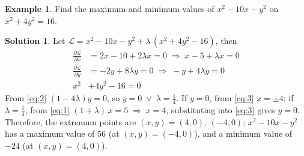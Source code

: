 \documentclass[10pt,handout]{beamer}
\newcommand{\ds}{\displaystyle}
\newcommand{\ie}{\;\Longrightarrow\;}
\newcommand{\orr}{\;\vee\;}
\theoremstyle{definition}
\newtheorem*{ex}{Example}
\newtheorem*{sol}{Solution}
\newcommand{\pdiff}[2]{\frac{\partial #1}{\partial #2}}
\begin{document}
\begin{frame}
\begin{ex} 
  Find the maximum and minimum values of $\ds x^2 - 10 x - y^2$ on $\ds x^2 + 4 y^2 = 16$. 
\end{ex}

\begin{sol}
  Let $\ds\mathcal{L} = x^2 - 10 x - y^2 + \lambda\,(x^2 + 4 y^2 - 16)$, then 
  \begin{align}
    \pdiff{\mathcal{L}}{x} &= 2 x - 10 + 2\lambda x = 0\ie x - 5 + \lambda x = 0 \label{eq:1}\\
    \pdiff{\mathcal{L}}{y} &= -2y + 8\lambda y = 0\ie -y + 4\lambda y = 0 \label{eq:2} \\
    x^2 &+ 4 y^2 - 16 = 0 \label{eq:3}
  \end{align}
  From \eqref{eq:2} $(1 - 4\lambda) y = 0$, so $y = 0\orr\lambda = \frac{1}{4}$. If $y = 0$, from \eqref{eq:3} $x = \pm 4$; if $\lambda=\frac{1}{4}$, from \eqref{eq:1} $(1 + \lambda)\,x = 5\ie x = 4$, substituting into \eqref{eq:3} gives $y = 0$. Therefore, the extremum points are $(x, y) = (4, 0),\,(-4, 0)$; $x^2 - 10x - y^2$ has a maximum value of $56$ (at $(x, y) = (-4, 0)$), and a minimum value of $-24$ (at $(x, y) = (4, 0)$). 
\end{sol}
\end{frame}

%
\end{document}
